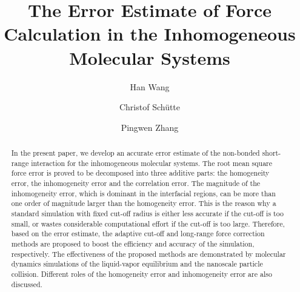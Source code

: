 \documentclass[aps,pre,preprint]{revtex4}
\newcommand{\recheck}[1]{{\color{red} #1}}
\begin{document}
\title{The Error Estimate of Force Calculation in the Inhomogeneous Molecular Systems}
\author{Han Wang}
\author{Christof Sch\"utte}
\author{Pingwen Zhang}

\begin{abstract}
  \recheck{
    In the present paper, we develop an accurate error estimate of the
    non-bonded short-range interaction for the inhomogeneous molecular
    systems.
    The root mean square force error is proved to be decomposed into
    three additive parts: the homogeneity error, the inhomogeneity error
    and the correlation error.
    The magnitude of the inhomogeneity error, which
    is dominant in the interfacial regions, 
    can be more than one order of magnitude larger than the homogeneity
    error.
    This is the reason why a standard simulation with fixed
    cut-off radius is either less accurate if the cut-off is too small,
    or wastes considerable computational effort if the cut-off is too large.
    Therefore, based on the error estimate, the adaptive cut-off
    and long-range force correction methods are proposed to
    boost the efficiency and accuracy of the simulation, respectively.
    The
    effectiveness of the proposed methods are demonstrated by
    molecular dynamics 
    simulations of the liquid-vapor equilibrium and the nanoscale particle
    collision. Different roles of the homogeneity error and inhomogeneity
    error are also discussed.
  }
\end{abstract}

\maketitle
\end{document}
